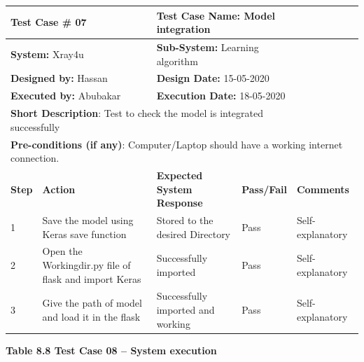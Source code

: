 \documentclass{article} %
\begin{document}
\begin{tabular}{|p{0.3in}|p{1.2in}|p{1.4in}|p{0.5in}|p{0.7in}|} \hline 
\multicolumn{2}{|p{1in}|}{\textbf{Test Case \#} 07} & \multicolumn{2}{|p{1.9in}|}{\textbf{Test Case Name:} Model integration} &  \\ \hline 
\multicolumn{2}{|p{1in}|}{\textbf{System:} Xray4u} & \multicolumn{2}{|p{1.9in}|}{\textbf{Sub-System: }Learning algorithm} &  \\ \hline 
\multicolumn{2}{|p{1in}|}{\textbf{Designed by:} Hassan} & \multicolumn{2}{|p{1.9in}|}{\textbf{Design Date:} 15-05-2020} &  \\ \hline 
\multicolumn{2}{|p{1in}|}{\textbf{Executed by: }Abubakar} & \multicolumn{2}{|p{1.9in}|}{\textbf{Execution Date:} 18-05-2020} &  \\ \hline 
\multicolumn{4}{|p{1in}|}{\textbf{Short Description}: Test to check the model is integrated successfully} &  \\ \hline 
\multicolumn{5}{|p{1in}|}{\textbf{Pre-conditions (if any)}: Computer/Laptop should have a working internet connection.} \\ \hline 
\textbf{Step} & \textbf{Action} & \textbf{Expected System Response} & \textbf{Pass/Fail} & \textbf{Comments} \\ \hline 
1 & Save the model using Keras save function & Stored to the desired Directory & Pass & Self-explanatory \\ \hline 
2 & Open the Workingdir.py file of flask and import Keras & Successfully imported & Pass & Self-explanatory \\ \hline 
3 & Give the path of model and load it in the flask & Successfully imported and working & Pass & Self-explanatory \\ \hline 
\end{tabular}

\eject 

\noindent \textbf{Table 8.8 Test Case 08 -- System execution}
\end{document}
